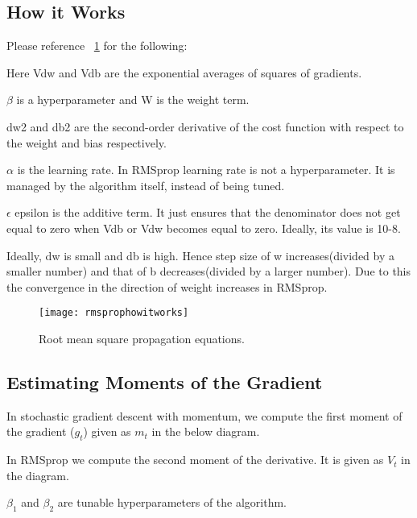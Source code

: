 	\subsection{How it Works}
Please reference \figurename~\ref{fig:rmsprophowitworks} for the following:
	\begin{bulletedlist}
		\item Here Vdw and Vdb are the exponential averages of squares of gradients.
		\item $\beta$ is a hyperparameter and W is the weight term.
		\item dw2 and db2 are the second-order derivative of the cost function with respect to the weight and bias respectively.
		\item $\alpha$ is the learning rate. In RMSprop learning rate is not a hyperparameter.  It is managed by the algorithm itself, instead of being tuned.
		\item $\epsilon$ epsilon is the additive term.  It just ensures that the denominator does not get equal to zero when Vdb or Vdw becomes equal to zero.  Ideally, its value is 10-8.
		\item Ideally, dw is small and db is high. Hence step size of w increases(divided by a smaller number) and that of b decreases(divided by a larger number).  Due to this the convergence in the direction of weight increases in RMSprop.
	\end{bulletedlist}
 	\begin{figure}[htb]
		\centering
		\texttt{[image: rmsprophowitworks]}
		\caption[Root mean square propagation equations]{Root mean square propagation equations.}
		\label{fig:rmsprophowitworks}
	\end{figure}

	\subsection{Estimating Moments of the Gradient}

	\begin{bulletedlist}
		\item In stochastic gradient descent with momentum, we compute the first moment of the gradient ($g_t$) given as $m_t$ in the below diagram.
		\item In RMSprop we compute the second moment of the derivative. It is given as $V_t$ in the diagram.
		\item $\beta_1$ and $\beta_2$ are tunable hyperparameters of the algorithm.
	\end{bulletedlist}

